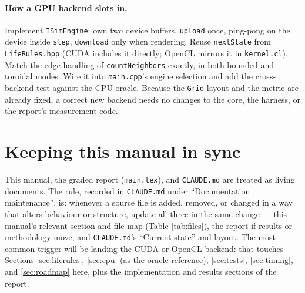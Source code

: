 \documentclass[
	english,
	letterpaper, oneside
]{article}
\begin{document}
\paragraph{How a GPU backend slots in.} Implement \texttt{ISimEngine}: own two
device buffers, \texttt{upload} once, ping-pong on the device inside
\texttt{step}, \texttt{download} only when rendering. Reuse \texttt{nextState}
from \texttt{LifeRules.hpp} (CUDA includes it directly; OpenCL mirrors it in
\texttt{kernel.cl}). Match the edge handling of \texttt{countNeighbors} exactly,
in both bounded and toroidal modes. Wire it into \texttt{main.cpp}'s engine
selection and add the cross-backend test against the CPU oracle. Because the
\texttt{Grid} layout and the metric are already fixed, a correct new backend
needs no changes to the core, the harness, or the report's measurement code.

\section{Keeping this manual in sync}
\label{sec:maintenance}

This manual, the graded report (\texttt{main.tex}), and \texttt{CLAUDE.md} are
treated as living documents. The rule, recorded in \texttt{CLAUDE.md} under
``Documentation maintenance'', is: whenever a source file is added, removed, or
changed in a way that alters behaviour or structure, update all three in the
same change --- this manual's relevant section and file map (Table
\ref{tab:files}), the report if results or methodology move, and
\texttt{CLAUDE.md}'s ``Current state'' and layout. The most common trigger will
be landing the CUDA or OpenCL backend: that touches Sections \ref{sec:liferules},
\ref{sec:cpu} (as the oracle reference), \ref{sec:tests}, \ref{sec:timing}, and
\ref{sec:roadmap} here, plus the implementation and results sections of the
report.

\end{document}
